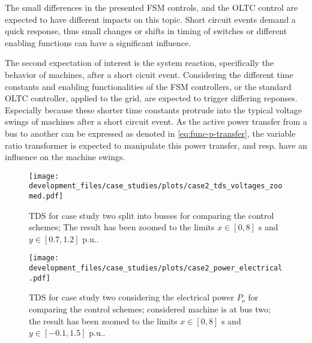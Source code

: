 The small differences in the presented \acs{FSM} controls, and the \acs{OLTC} control are expected to have different impacts on this topic.
Short circuit events demand a quick response, thus small changes or shifts in timing of switches or different enabling functions can have a significant influence.


The second expectation of interest is the system reaction, specifically the behavior of machines, after a short cicuit event.
Considering the different time constants and enabling functionalities of the \acs{FSM} controllers, or the standard \acs{OLTC} controller, applied to the grid, are expected to trigger differing reponses.
Especially because these shorter time constants protrude into the typical voltage swings of machines after a short circuit event.
As the active power transfer from a bus to another can be expressed as denoted in \autoref{eq:func-p-transfer}, the variable ratio transformer is expected to manipulate this power transfer, and resp. have an influence on the machine swings.


\begin{figure}[htbp!]
    \centering
    \texttt{[image: development\_files/case\_studies/plots/case2\_tds\_voltages\_zoomed.pdf]}
    \caption[\acs{TDS} for case study two split into busses for comparing the control schemes]{\acs{TDS} for case study two split into busses for comparing the control schemes; The result has been zoomed to the limits $x \in [0,8]\text{ s}$ and $y \in [0.7,1.2]\text{ p.u.}$.}
    \label{fig:case2-voltages}
\end{figure}

\begin{figure}[htbp!]
    \centering
    \texttt{[image: development\_files/case\_studies/plots/case2\_power\_electrical.pdf]}
    \caption[\acs{TDS} for case study two considering the electrical power]{\acs{TDS} for case study two considering the electrical power $P_\mathrm{e}$ for comparing the control schemes; considered machine is at bus two; the result has been zoomed to the limits $x \in [0,8]\text{ s}$ and $y \in [-0.1,1.5]\text{ p.u.}$.}
    \label{fig:case2-power}
\end{figure}

